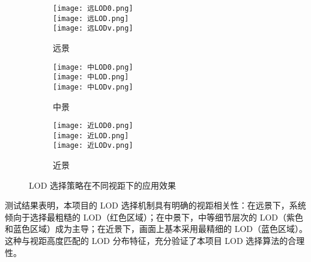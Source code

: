 \begin{figure*}[h]
    \centering
    \begin{subfigure}[b]{0.32\linewidth}
        \centering
        \texttt{[image: 远LOD0.png]}\\
        \vspace{0.1cm}
        \texttt{[image: 远LOD.png]}\\
        \vspace{0.1cm}
        \texttt{[image: 远LODv.png]}
        \caption{远景}
    \end{subfigure}%
    \hfill %
    \begin{subfigure}[b]{0.32\linewidth}
        \centering
        \texttt{[image: 中LOD0.png]}\\
        \vspace{0.1cm}
        \texttt{[image: 中LOD.png]}\\
        \vspace{0.1cm}
        \texttt{[image: 中LODv.png]}
        \caption{中景}
    \end{subfigure}%
    \hfill %
    \begin{subfigure}[b]{0.32\linewidth}
        \centering
        \texttt{[image: 近LOD0.png]}\\
        \vspace{0.1cm}
        \texttt{[image: 近LOD.png]}\\
        \vspace{0.1cm}
        \texttt{[image: 近LODv.png]}
        \caption{近景}
    \end{subfigure}
    \caption{LOD 选择策略在不同视距下的应用效果}
    \label{fig:LOD select}
\end{figure*}

测试结果表明，本项目的 LOD 选择机制具有明确的视距相关性：在远景下，系统倾向于选择最粗糙的 LOD（红色区域）；在中景下，中等细节层次的 LOD（紫色和蓝色区域）成为主导；在近景下，画面上基本采用最精细的 LOD（蓝色区域）。这种与视距高度匹配的 LOD 分布特征，充分验证了本项目 LOD 选择算法的合理性。

